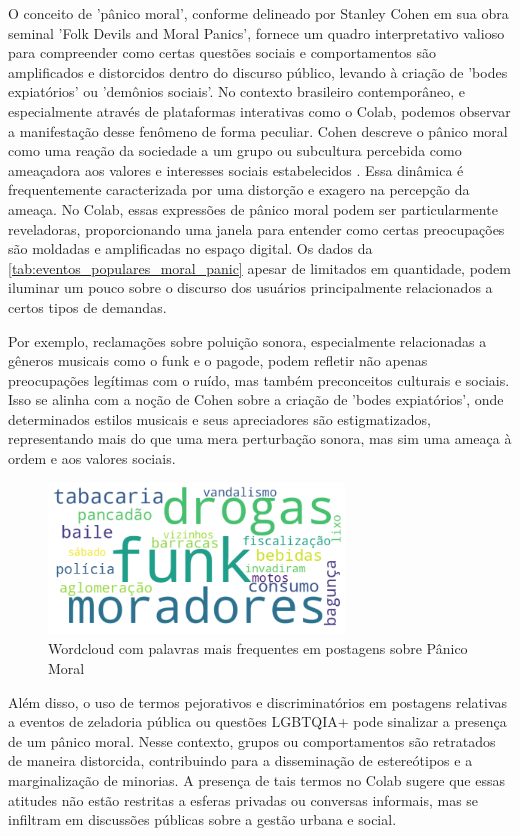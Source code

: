 O conceito de 'pânico moral', conforme delineado por Stanley Cohen em sua obra seminal 'Folk Devils and Moral Panics', fornece um quadro interpretativo valioso para compreender como certas questões sociais e comportamentos são amplificados e distorcidos dentro do discurso público, levando à criação de 'bodes expiatórios' ou 'demônios sociais'. No contexto brasileiro contemporâneo, e especialmente através de plataformas interativas como o Colab, podemos observar a manifestação desse fenômeno de forma peculiar. Cohen descreve o pânico moral como uma reação da sociedade a um grupo ou subcultura percebida como ameaçadora aos valores e interesses sociais estabelecidos \cite{2002_Cohen_BOOK}. Essa dinâmica é frequentemente caracterizada por uma distorção e exagero na percepção da ameaça. No Colab, essas expressões de pânico moral podem ser particularmente reveladoras, proporcionando uma janela para entender como certas preocupações são moldadas e amplificadas no espaço digital. Os dados da \autoref{tab:eventos_populares_moral_panic} apesar de limitados em quantidade, podem iluminar um pouco sobre o discurso dos usuários principalmente relacionados a certos tipos de demandas. 

Por exemplo, reclamações sobre poluição sonora, especialmente relacionadas a gêneros musicais como o funk e o pagode, podem refletir não apenas preocupações legítimas com o ruído, mas também preconceitos culturais e sociais. Isso se alinha com a noção de Cohen sobre a criação de 'bodes expiatórios', onde determinados estilos musicais e seus apreciadores são estigmatizados, representando mais do que uma mera perturbação sonora, mas sim uma ameaça à ordem e aos valores sociais.

\begin{figure}[htb]
	\centering
	\includegraphics[width=0.7\textwidth]{images/wordcloud_moral.png}
	\caption{Wordcloud com palavras mais frequentes em postagens sobre Pânico Moral}
	\label{fig:wordcloud_moral}
\end{figure}

Além disso, o uso de termos pejorativos e discriminatórios em postagens relativas a eventos de zeladoria pública ou questões LGBTQIA+ pode sinalizar a presença de um pânico moral. Nesse contexto, grupos ou comportamentos são retratados de maneira distorcida, contribuindo para a disseminação de estereótipos e a marginalização de minorias. A presença de tais termos no Colab sugere que essas atitudes não estão restritas a esferas privadas ou conversas informais, mas se infiltram em discussões públicas sobre a gestão urbana e social.

